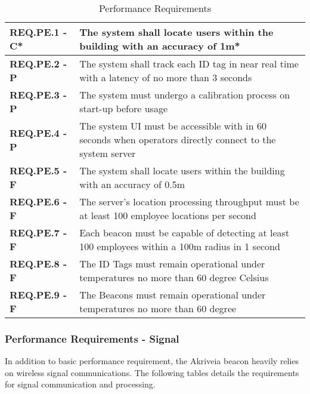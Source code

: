 \bigskip
\bgroup
\def\arraystretch{1.5}
\begin{table}[H]
\centering
\begin{tabular}{ | m{3.5cm} | m{12.5cm} |} 
 \hline
 \textbf{REQ.PE.1 - C*} & The system shall locate users within the building with an accuracy of 1m* \\ 
\hline
 \textbf{REQ.PE.2 - P} & The system shall track each ID tag in near real time with a latency of no more than 3 seconds \\ 
\hline
 \textbf{REQ.PE.3 - P} & The system must undergo a calibration process on start-up before usage \\ 
\hline
 \textbf{REQ.PE.4 - P} & The system UI must be accessible with in 60 seconds when operators directly connect to the system server \\
\hline
 \textbf{REQ.PE.5 - F} & The system shall locate users within the building with an accuracy of 0.5m \\
\hline
 \textbf{REQ.PE.6 - F} & The server's location processing throughput must be at least 100 employee locations per second \\
\hline
 \textbf{REQ.PE.7 - F} & Each beacon must be capable of detecting at least 100 employees within a 100m radius in 1 second \\
\hline
 \textbf{REQ.PE.8 - F} & The ID Tags must remain operational under temperatures no more than 60 degree Celsius \\
\hline
 \textbf{REQ.PE.9 - F} & The Beacons must remain operational under temperatures no more than 60 degree  \\
\hline
\end{tabular}
\caption{Performance Requirements}
\end{table}	

\break

\subsubsection{Performance Requirements - Signal}
In addition to basic performance requirement, the Akriveia beacon heavily relies on wireless signal communications. The following tables details the requirements for signal communication and processing.
\bigskip

